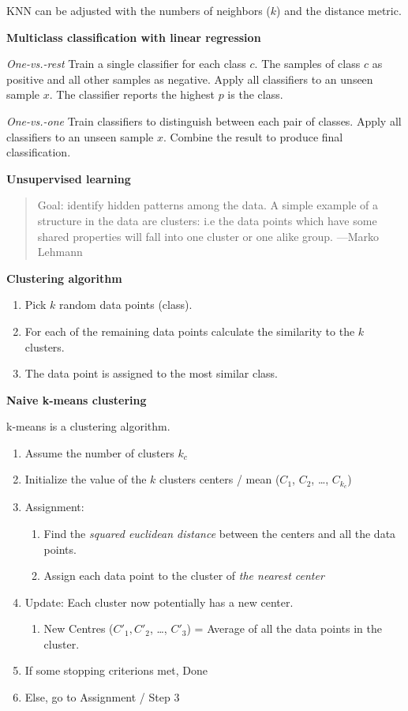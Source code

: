 \documentclass[11pt,landscape]{article}
\begin{document}
\begin{multicols}{3}
KNN can be adjusted with the numbers of neighbors (\(k\)) and the distance metric.


\textbf{Multiclass classification with linear regression}

\emph{One-vs.-rest}
Train a single classifier for each class \(c\).
The samples of class \(c\) as positive and all other samples as negative.
Apply all classifiers to an unseen sample \(x\).
The classifier reports the highest \(p\) is the class.


\emph{One-vs.-one}
Train classifiers to distinguish between each pair of classes.
Apply all classifiers to an unseen sample \(x\).
Combine the result to produce final classification.

\textbf{Unsupervised learning}

\begin{quote}
Goal: identify hidden patterns among the data.
A simple example of a structure in the data
are clusters: i.e the data points which
have some shared properties will fall into
one cluster or one alike group. ---Marko Lehmann
\end{quote}


\textbf{Clustering algorithm}

\begin{enumerate}
\item Pick \(k\) random data points (class).
\item For each of the remaining data points calculate the similarity to the \(k\) clusters.
\item The data point is assigned to the most similar class.
\end{enumerate}


\textbf{Naive k-means clustering}

k-means is a clustering algorithm.

\begin{enumerate}
\item Assume the number of clusters \(k_c\)
\item Initialize the value of the \(k\) clusters centers / mean (\(C_1\), \(C_2\), \ldots{}, \(C_{k_c}\))
\item Assignment:
\begin{enumerate}
\item Find the \emph{squared euclidean distance} between the centers and all the data points.
\item Assign each data point to the cluster of \emph{the nearest center}
\end{enumerate}
\item Update: Each cluster now potentially has a new center.
\begin{enumerate}
\item New Centres (\(C'_1, C'_2\), \ldots{}, \(C'_3\)) = Average of all the data points in the cluster.
\end{enumerate}
\item If some stopping criterions met, Done
\item Else, go to Assignment / Step 3
\end{enumerate}



\end{multicols}
\end{document}
